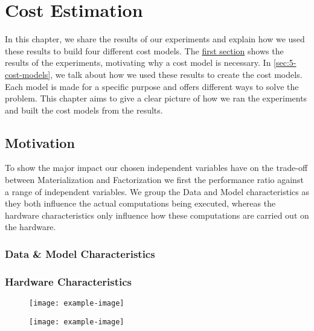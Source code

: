 
\chapter{Cost Estimation}

\label{chapter:cost-estimation}
In this chapter, we share the results of our experiments and explain how we used these results to build four different cost models. The \hyperref[sec:5-motivation]{first section} shows the results of the experiments, motivating why a cost model is necessary. In \autoref{sec:5-cost-models}, we talk about how we used these results to create the cost models. Each model is made for a specific purpose and offers different ways to solve the problem. This chapter aims to give a clear picture of how we ran the experiments and built the cost models from the results.

\section{Motivation}
\label{sec:5-motivation}
To show the major impact our chosen independent variables have on the trade-off between Materialization and Factorization we first the performance ratio against a range of independent variables. We group the Data and Model characteristics as they both influence the actual computations being executed, whereas the hardware characteristics only influence how these computations are carried out on the hardware.

\subsection{Data \& Model Characteristics}


\subsection{Hardware Characteristics}

\begin{figure}[ht]
    \centering
    \texttt{[image: example-image]}
    \caption{}
    \label{fig:5-cpu-parallelism}
\end{figure}


\begin{figure}[ht]
    \centering
    \texttt{[image: example-image]}
    \caption{}
    \label{fig:5-gpu-characteristics}
\end{figure}


